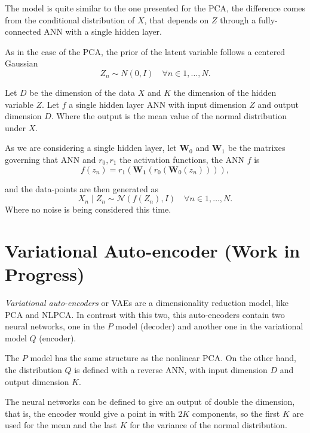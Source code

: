 The model is quite similar to the one presented for the PCA, the difference comes from the conditional distribution of \(X\), that depends on \(Z\) through a fully-connected ANN with a single hidden layer.

As in the case of the PCA, the prior of the latent variable follows a centered Gaussian
\[
  Z_{n} \sim N(0,I) \quad \forall n \in 1,\dots,N.
\]

Let \(D\) be the dimension of the data \(X\) and \(K\) the dimension of the hidden variable \(Z\). Let \(f\) a single hidden layer ANN with input dimension \(Z\) and output dimension \(D\). Where the output is the mean value of the normal distribution under \(X\).

As we are considering a single hidden layer, let \(\bm{W}_{0}\) and \(\bm{W}_{1}\) be the matrixes governing that ANN and \(r_{0}, r_{1}\) the activation functions, the ANN \(f\) is
\[
  f(z_{n}) = r_{1}(\bm{W_{1}}(r_{0}(\bm{W}_{0}(z_{n})))),
\]

and the data-points are then generated as
\[
  X_{n}\mid Z_{n} \sim \mathcal{N}(f(Z_{n}), I) \quad \forall n \in 1,\dots,N.
\]
Where no noise is being considered this time.

\section{Variational Auto-encoder (Work in Progress)}

\emph{Variational auto-encoders} or VAEs are a dimensionality reduction model, like PCA and NLPCA. In contrast with this two, this auto-encoders contain two neural networks, one in the \(P\) model (decoder) and another one in the variational model \(Q\) (encoder).

The \(P\) model has the same structure as the nonlinear PCA. On the other hand, the  distribution \(Q\) is defined with a reverse ANN, with input dimension \(D\) and output dimension \(K\).

The neural networks can be defined to give an output of double the dimension, that is, the encoder would give a point in with \( 2K \) components, so the first \( K \) are used for the mean and the last \( K \) for the variance of the normal distribution.

